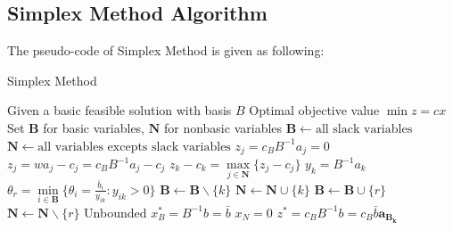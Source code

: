 				\subsection{Simplex Method Algorithm}
					The pseudo-code of Simplex Method is given as following:
					\begin{algorithm}[h!]
						\caption{Simplex Method}
						\begin{algorithmic}[1]
							\Require Given a basic feasible solution with basis $B$
							\Ensure Optimal objective value $\min z= cx$
							\State Set $\mathbf{B}$ for basic variables, $\mathbf{N}$ for nonbasic variables
							\State $\mathbf{B} \gets \text{all slack variables}$
							\State $\mathbf{N} \gets \text{all variables excepts slack variables}$
								\State $z_j=c_BB^{-1}a_j=0$
							\EndFor
								\State $z_j=wa_j-c_j=c_BB^{-1}a_j-c_j$
								\State $z_k-c_k=\max\limits_{j \in \mathbf{N}}\{z_j-c_j\}$
								\State $y_k=B^{-1}a_k$
									\State $\theta_r=\min\limits_{i \in \mathbf{B}}\{\theta_i=\frac{\bar{b}_i}{y_{ik}}:y_{ik}>0\}$
									\State $\mathbf{B} \gets \mathbf{B} \backslash \{k\}$
									\State $\mathbf{N} \gets \mathbf{N} \cup \{k\}$
									\State $\mathbf{B} \gets \mathbf{B} \cup \{r\}$
									\State $\mathbf{N} \gets \mathbf{N} \backslash \{r\}$
								\Else
									\State Unbounded
								\EndIf
							\EndWhile
							\State $x_B^*=B^{-1}b=\bar{b}$
							\State $x_N=0$
							\State $z^*=c_BB^{-1}b=c_B\bar{b}\mathbf{a_{B_k}}$
						\end{algorithmic}
					\end{algorithm}

